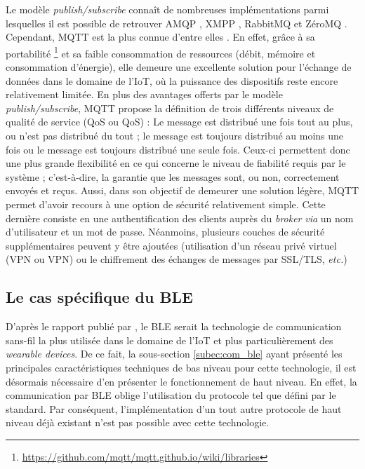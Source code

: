 Le modèle \textit{publish/subscribe} connaît de nombreuses implémentations parmi lesquelles il est possible de retrouver \ac{AMQP} \citep{Vinoski2006}, \ac{XMPP} \citep{Saint-Andre2011}, RabbitMQ \citep{Dossot2014} et ZéroMQ \citep{Hintjens2013}. Cependant, \ac{MQTT} est la plus connue d'entre elles \citep{Hunkeler2008}. En effet, grâce à sa portabilité \footnote{\url{https://github.com/mqtt/mqtt.github.io/wiki/libraries}} et sa faible consommation de ressources (débit, mémoire et consommation d'énergie), elle demeure une excellente solution pour l'échange de données dans le domaine de l'\acs{IoT}, où la puissance des dispositifs reste encore relativement limitée. En plus des avantages offerts par le modèle \textit{publish/subscribe}, \acs{MQTT} propose la définition de trois différents niveaux de qualité de service (\acl{QoS} ou \acs{QoS}) : Le message est distribué une fois tout au plus, ou n'est pas distribué du tout ; le message est toujours distribué au moins une fois ou le message est toujours distribué une seule fois. Ceux-ci permettent donc une plus grande flexibilité en ce qui concerne le niveau de fiabilité requis par le système ; c'est-à-dire, la garantie que les messages sont, ou non, correctement envoyés et reçus. Aussi, dans son objectif de demeurer une solution légère, \acs{MQTT} permet d'avoir recours à une option de sécurité relativement simple. Cette dernière consiste en une authentification des clients auprès du \textit{broker} \textit{via} un nom d'utilisateur et un mot de passe. Néanmoins, plusieurs couches de sécurité supplémentaires peuvent y être ajoutées (utilisation d'un réseau privé virtuel (\acl{VPN} ou \acs{VPN}) ou le chiffrement des échanges de messages par \acs{SSL}/\acs{TLS}, \textit{etc.})

\subsection{Le cas spécifique du \acs{BLE}}

D'après le rapport publié par \cite{ON2017}, le \ac{BLE} serait la technologie de communication sans-fil la plus utilisée dans le domaine de l'\acs{IoT} et plus particulièrement des \textit{wearable devices}. De ce fait, la sous-section \ref{subec:com_ble} ayant présenté les principales caractéristiques techniques de bas niveau pour cette technologie, il est désormais nécessaire d'en présenter le fonctionnement de haut niveau. En effet, la communication par \acs{BLE} oblige l'utilisation du protocole tel que défini par le standard. Par conséquent, l'implémentation d'un tout autre protocole de haut niveau déjà existant n'est pas possible avec cette technologie.

